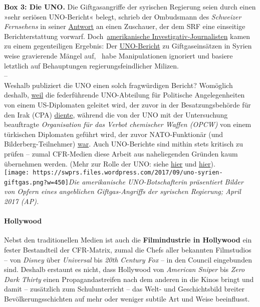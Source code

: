 \textbf{Box 3: Die UNO.} Die Giftgasangriffe der syrischen Regierung
seien durch einen »sehr seriösen UNO-Bericht« belegt, schrieb der
Ombudsmann des \emph{Schweizer Fernsehens} in seiner
\href{https://swprs.org/srf-ombudsstelle-im-faktencheck/}{Antwort} an
einen Zuschauer, der dem SRF eine einseitige Bericht­erstattung vorwarf.
Doch~\href{https://consortiumnews.com/2016/09/08/un-team-heard-claims-of-staged-chemical-attacks/}{amerikanische
Investigativ-Journalisten} kamen zu einem gegenteiligen Ergebnis: Der
\href{http://daccess-ods.un.org/access.nsf/GetFile?OpenAgent\&DS=S/2016/738\&Lang=E\&Type=PDF}{UNO-Bericht}
zu Gift­gas­einsätzen in Syrien weise gravierende Mängel auf,~ habe
Manipu­lationen ignoriert und basiere letztlich auf Behauptungen
regierungs­­feind­licher Milizen.\\
--\\
Weshalb publiziert die UNO einen solch fragwürdigen Bericht? Womöglich
deshalb,
\href{https://www.rubikon.news/artikel/die-vereinten-nationen-in-den-handen-der-kriegstreiber-1-3}{weil}
die federführende UNO-Abteilung für Politische Angelegenheiten von einem
US-Diplomaten geleitet wird, der zuvor in der Besatzungs­behörde für den
Irak (CPA)
\href{https://en.wikipedia.org/wiki/Jeffrey_D._Feltman}{diente}, während
die von der UNO mit der Untersuchung beauftragte \emph{Organisation für
das Verbot chemischer Waffen (OPCW)} von einem türkischen Diplomaten
geführt wird, der zuvor NATO-Funktionär (und Bilderberg-Teilnehmer)
\href{https://en.wikipedia.org/wiki/Ahmet_\%C3\%9Cz\%C3\%BCmc\%C3\%BC}{war}.
Auch UNO-Berichte sind mithin stets kritisch zu prüfen -- zumal
CFR-Medien diese Arbeit aus naheliegenden Gründen kaum übernehmen
werden. (Mehr zur Rolle der UNO: siehe
\href{https://consortiumnews.com/2013/10/16/how-us-pressure-bends-un-agencies/}{hier}
und
\href{https://consortiumnews.com/2017/09/08/u-n-enablers-of-aggressive-war/}{hier}).\\
\texttt{[image: https://swprs.files.wordpress.com/2017/09/uno-syrien-giftgas.png?w=450]}\emph{Die
amerikanische UNO-Botschafterin präsentiert Bilder von Opfern eines
angeblichen Giftgas-Angriffs der syrischen Regierung; April 2017 (AP).}

\hypertarget{hollywood}{%
\paragraph{Hollywood}\label{hollywood}}

Nebst den traditionellen Medien ist auch die \textbf{Filmindustrie in
Hollywood} ein fester Bestandteil der CFR-Matrix, zumal die Chefs aller
bekannten Filmstudios -- von \emph{Disney} über \emph{Universal} bis
\emph{20th Century Fox} -- in den Council eingebunden sind. Deshalb
erstaunt es nicht, dass Hollywood von \emph{American Sniper} bis
\emph{Zero Dark Thirty} einen Propaganda­streifen nach dem anderen in
die Kinos bringt und damit -- zusätzlich zum Schulunterricht -- das
Welt- und Geschichtsbild breiter Bevölkerungs­schichten auf mehr oder
weniger subtile Art und Weise beeinflusst.

